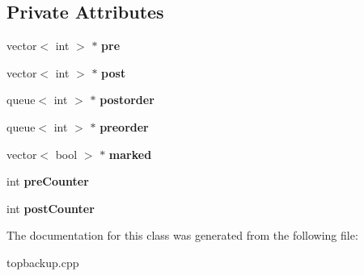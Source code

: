 \subsection*{Private Attributes}
\begin{DoxyCompactItemize}
\item 
\hypertarget{classDepthFS_a5c5b7f858a11eb4f007cd2d7069d3933}{vector$<$ int $>$ $\ast$ {\bfseries pre}}\label{classDepthFS_a5c5b7f858a11eb4f007cd2d7069d3933}

\item 
\hypertarget{classDepthFS_a248cd1f7eb28126c0ce28df6166951d0}{vector$<$ int $>$ $\ast$ {\bfseries post}}\label{classDepthFS_a248cd1f7eb28126c0ce28df6166951d0}

\item 
\hypertarget{classDepthFS_a2c47f92af7ecc279e3a5dbcc0abcce8e}{queue$<$ int $>$ $\ast$ {\bfseries postorder}}\label{classDepthFS_a2c47f92af7ecc279e3a5dbcc0abcce8e}

\item 
\hypertarget{classDepthFS_a7ccfc2fed94b84780f6e6a24732797fc}{queue$<$ int $>$ $\ast$ {\bfseries preorder}}\label{classDepthFS_a7ccfc2fed94b84780f6e6a24732797fc}

\item 
\hypertarget{classDepthFS_ab5e3b9f282bd4107f4fff08fb3d5407b}{vector$<$ bool $>$ $\ast$ {\bfseries marked}}\label{classDepthFS_ab5e3b9f282bd4107f4fff08fb3d5407b}

\item 
\hypertarget{classDepthFS_a20736b18aba76059d7011fc724fd4fb1}{int {\bfseries pre\+Counter}}\label{classDepthFS_a20736b18aba76059d7011fc724fd4fb1}

\item 
\hypertarget{classDepthFS_a602e5c44fb7725732494e4ff3c61fd6b}{int {\bfseries post\+Counter}}\label{classDepthFS_a602e5c44fb7725732494e4ff3c61fd6b}

\end{DoxyCompactItemize}


The documentation for this class was generated from the following file\+:\begin{DoxyCompactItemize}
\item 
topbackup.\+cpp\end{DoxyCompactItemize}
